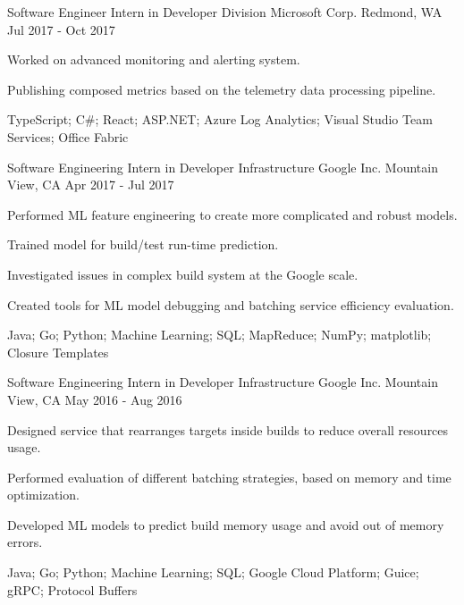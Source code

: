 \begin{cventries}
  \cventry
    {Software Engineer Intern in Developer Division} %
    {Microsoft Corp.} %
    {Redmond, WA} %
    {Jul 2017 - Oct 2017} %
    {
      \begin{cvitems} %
        \item {Worked on advanced monitoring and alerting system.}
        \item {Publishing composed metrics based on the telemetry data processing pipeline.}
        \item {TypeScript; C\#; React; ASP.NET; Azure Log Analytics; Visual Studio Team Services; Office Fabric}
      \end{cvitems}
    }
  \cventry
    {Software Engineering Intern in Developer Infrastructure} %
    {Google Inc.} %
    {Mountain View, CA} %
    {Apr 2017 - Jul 2017} %
    {
      \begin{cvitems} %
        \item {Performed ML feature engineering to create more complicated and robust models.}
        \item {Trained model for build/test run-time prediction.}
        \item {Investigated issues in complex build system at the Google scale.}
        \item {Created tools for ML model debugging and batching service efficiency evaluation.}
        \item {Java; Go; Python; Machine Learning; SQL; MapReduce; NumPy; matplotlib; Closure Templates}
      \end{cvitems}
    }
  \cventry
    {Software Engineering Intern in Developer Infrastructure} %
    {Google Inc.} %
    {Mountain View, CA} %
    {May 2016 - Aug 2016} %
    {
      \begin{cvitems} %
        \item {Designed service that rearranges targets inside builds to reduce overall resources usage.}
        \item {Performed evaluation of different batching strategies, based on memory and time optimization.}
        \item {Developed ML models to predict build memory usage and avoid out of memory errors.}
        \item {Java; Go; Python; Machine Learning; SQL; Google Cloud Platform; Guice; gRPC; Protocol Buffers}
      \end{cvitems}
    }
\end{cventries}
